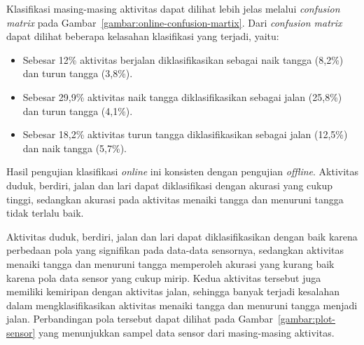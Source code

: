 Klasifikasi masing-masing aktivitas dapat dilihat lebih jelas melalui \textit{confusion matrix} pada Gambar~\ref{gambar:online-confusion-martix}. Dari \textit{confusion matrix} dapat dilihat beberapa kelasahan klasifikasi yang terjadi, yaitu:

\begin{itemize}
    \item Sebesar 12\% aktivitas berjalan diklasifikasikan sebagai naik tangga (8,2\%) dan turun tangga (3,8\%).
    \item Sebesar 29,9\% aktivitas naik tangga diklasifikasikan sebagai jalan (25,8\%) dan turun tangga (4,1\%).
    \item Sebesar 18,2\% aktivitas turun tangga diklasifikasikan sebagai jalan (12,5\%) dan naik tangga (5,7\%).
\end{itemize}

Hasil pengujian klasifikasi \textit{online} ini konsisten dengan pengujian \textit{offline}. Aktivitas duduk, berdiri, jalan dan lari dapat diklasifikasi dengan akurasi yang cukup tinggi, sedangkan akurasi pada aktivitas menaiki tangga dan menuruni tangga tidak terlalu baik.

Aktivitas duduk, berdiri, jalan dan lari dapat diklasifikasikan dengan baik karena perbedaan pola yang signifikan pada data-data sensornya, sedangkan aktivitas menaiki tangga dan menuruni tangga memperoleh akurasi yang kurang baik karena pola data sensor yang cukup mirip. Kedua aktivitas tersebut juga memiliki kemiripan dengan aktivitas jalan, sehingga banyak terjadi kesalahan dalam mengklasifikasikan aktivitas menaiki tangga dan menuruni tangga menjadi jalan. Perbandingan pola tersebut dapat dilihat pada Gambar~\ref{gambar:plot-sensor} yang menunjukkan sampel data sensor dari masing-masing aktivitas.

